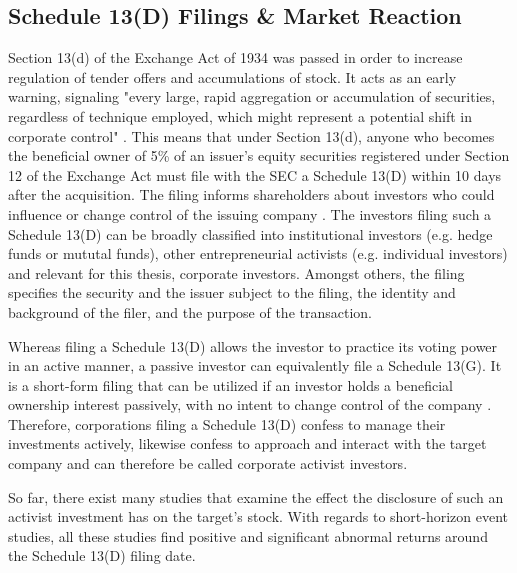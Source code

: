 \documentclass[12pt]{article}
\begin{document}
\subsection{Schedule 13(D) Filings \& Market Reaction}

\noindent Section 13(d) of the Exchange Act of 1934 was passed in order to increase regulation of tender offers and accumulations of stock.
It acts as an early warning, signaling "every large, rapid aggregation or accumulation of securities, regardless of technique employed, which might represent a potential shift in corporate control" \citep[p.2]{Morrison2015}. 
This means that under Section 13(d), anyone who becomes the beneficial owner of 5\% of an issuer's equity securities registered under Section 12 of the Exchange Act must file with the SEC a Schedule 13(D) within 10 days after the acquisition. The filing informs shareholders about investors who could influence or change control of the issuing company \citep[p.110]{Giglia2016}. The investors filing such a Schedule 13(D) can be broadly classified into institutional investors (e.g. hedge funds or mututal funds), other entrepreneurial activists (e.g. individual investors) \citep[p.188]{Klein2009} and relevant for this thesis, corporate investors. Amongst others, the filing specifies the security and the issuer subject to the filing, the identity and background of the filer, and the purpose of the transaction.\par
Whereas filing a Schedule 13(D) allows the investor to practice its voting power in an active manner, a passive investor can equivalently file a Schedule 13(G). It is a short-form filing that can be utilized if an investor holds a beneficial ownership interest passively, with no intent to change control of the company \citep{Giglia2016}. Therefore, corporations filing a Schedule 13(D) confess to manage their investments actively, likewise confess to approach and interact with the target company and can therefore be called corporate activist investors.\par
So far, there exist many studies that examine the effect the disclosure of such an activist investment has on the target's stock. With regards to short-horizon event studies, all these studies find positive and significant abnormal returns around the Schedule 13(D) filing date. 
\end{document}
